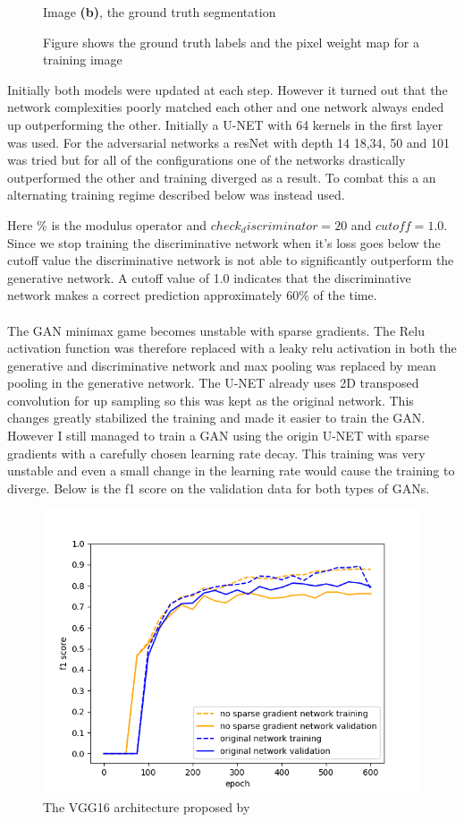 \documentclass[a4paper,11pt]{article}
\begin{document}
\begin{figure}[H]
  Image \textbf{(b)}, the ground truth segmentation
\endminipage\hfill
\caption{Figure shows the ground truth labels and the pixel weight map for a training image}
\end{figure}
Initially both models were updated at each step. However it turned out that the network complexities poorly matched each other and one network always ended up outperforming the other. Initially a U-NET with 64 kernels in the first layer was used. For the adversarial networks a resNet with depth 14 18,34, 50 and 101 was tried but for all of the configurations one of the networks drastically outperformed the other and training diverged as a result. To combat this a an alternating training regime described below was instead used.

Here \% is the modulus operator and $check_discriminator=20$ and $cutoff=1.0$. Since we stop training the discriminative network when it's loss goes below the cutoff value the discriminative network is not able to significantly outperform the generative network. A cutoff value of 1.0 indicates that the discriminative network makes a correct prediction approximately 60\% of the time.\\
\\
The GAN minimax game becomes unstable with sparse gradients. The Relu activation function was therefore replaced with a leaky relu activation in both the generative and discriminative network and max pooling was replaced by mean pooling in the generative network. The U-NET already uses 2D transposed convolution for up sampling so this was kept as the original network. This changes greatly stabilized the training and made it easier to train the GAN. However I still managed to train a GAN using the origin U-NET with sparse gradients with a carefully chosen learning rate decay. This training was very unstable and even a small change in the learning rate would cause the training to diverge. Below is the f1 score on the validation data for both types of GANs.
\begin{center}
\begin{figure}[H]
      \includegraphics[scale=0.7]{mean_max_2}
  \caption{The VGG16 architecture proposed by \cite{simonyan_very_2014}} \label{fig:vgg}
\end{figure}
\end{center}
\end{document}
